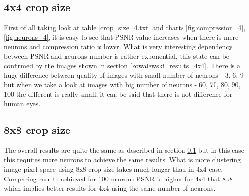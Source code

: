 \documentclass[../IDP_Task5_Karwowski_Kowalewski.tex]{subfiles}
\begin{document}
 {

    \subsection{4x4 crop size} \label{results_4x4} {
        First of all taking look at table \ref{crop_size_4.txt} and charts
        \ref{fig:compression_4}, \ref{fig:neurons_4}, it is easy to see that PSNR value
        increases when there is more neurons and compression ratio is lower. What is
        very interesting dependency between PSNR and neurons number is rather
        exponential, this state can be confirmed by the images shown in section
        \ref{kowalewski_results_4x4}. There is a huge difference between quality of
        images with small number of neurons - 3, 6, 9 but when we take a look at
        images with big number of neurons - 60, 70, 80, 90, 100 the different is really
        small, it can be said that there is not difference for human eyes.
    }

    \subsection{8x8 crop size} \label{results_8x8} {
        The overall results are quite the same as described in section
        \ref{results_4x4} but in this case this requires more neurons to achieve the
        same results. What is more clustering image pixel space using 8x8 crop size
        takes much longer than in 4x4 case. Comparing results achieved for 100 neurons
        PSNR is higher for 4x4 that 8x8 which implies better results for 4x4 using the
        same number of neurons.
    }
}
\end{document}
